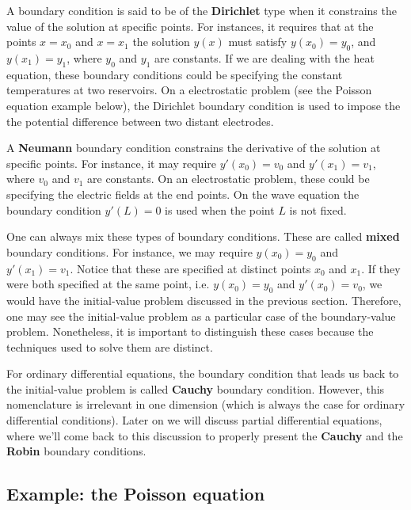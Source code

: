 A boundary condition is said to be of the \textbf{Dirichlet} type when it constrains the value of the solution at specific points. For instances, it requires that at the points $x=x_0$ and $x=x_1$ the solution $y(x)$ must satisfy $y(x_0) = y_0$, and $y(x_1) = y_1$, where $y_0$ and $y_1$ are constants. If we are dealing with the heat equation, these boundary conditions could be specifying the constant temperatures at two reservoirs. On a electrostatic problem (see the Poisson equation example below), the Dirichlet boundary condition is used to impose the the potential difference between two distant electrodes.

A \textbf{Neumann} boundary condition constrains the derivative of the solution at specific points. For instance, it may require $y'(x_0) = v_0$ and $y'(x_1) = v_1$, where $v_0$ and $v_1$ are constants. On an electrostatic problem, these could be specifying the electric fields at the end points. On the wave equation the boundary condition $y'(L) = 0$ is used when the point $L$ is not fixed.

One can always mix these types of boundary conditions. These are called \textbf{mixed} boundary conditions. For instance, we may require $y(x_0) = y_0$ and $y'(x_1) = v_1$. Notice that these are specified at distinct points $x_0$ and $x_1$. If they were both specified at the same point, i.e. $y(x_0) = y_0$ and $y'(x_0) = v_0$, we would have the initial-value problem discussed in the previous section. Therefore, one may see the initial-value problem as a particular case of the boundary-value problem. Nonetheless, it is important to distinguish these cases because the techniques used to solve them are distinct.

For ordinary differential equations, the boundary condition that leads us back to the initial-value problem is called \textbf{Cauchy} boundary condition. However, this nomenclature is irrelevant in one dimension (which is always the case for ordinary differential conditions). Later on we will discuss partial differential equations, where we'll come back to this discussion to properly present the \textbf{Cauchy} and the \textbf{Robin} boundary conditions.



\subsection*{Example: the Poisson equation}

